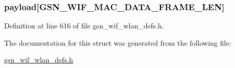 \hypertarget{a00315_a70bbc91720090e476964a75df3a83fd3}{
\subsubsection[{payload}]{ {\bf payload}\mbox{[}GSN\_\-WIF\_\-MAC\_\-DATA\_\-FRAME\_\-LEN\mbox{]}}}
\label{a00315_a70bbc91720090e476964a75df3a83fd3}


Definition at line 616 of file gsn\_\-wif\_\-wlan\_\-defs.h.



The documentation for this struct was generated from the following file:\begin{DoxyCompactItemize}
\item 
\hyperlink{a00613}{gsn\_\-wif\_\-wlan\_\-defs.h}\end{DoxyCompactItemize}
